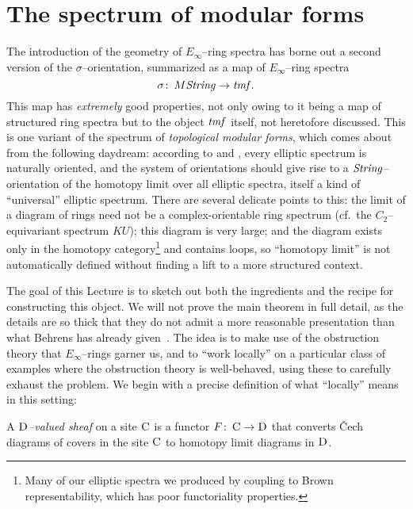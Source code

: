 \section{The spectrum of modular forms}\label{ConstructionOfTMFSection}

The introduction of the geometry of \(E_\infty\)--ring spectra has borne out a second version of the \(\sigma\)--orientation, summarized as a map of \(E_\infty\)--ring spectra \[\sigma\colon\thinspace M\mathit{String} \to \mathit{tmf}.\]  This map has \emph{extremely} good properties, not only owing to it being a map of structured ring spectra but to the object \(\mathit{tmf}\) itself, not heretofore discussed.  This is one variant of the spectrum of \textit{topological modular forms}, which comes about from the following daydream: according to  and , every elliptic spectrum is naturally oriented, and the system of orientations should give rise to a \(\mathit{String}\)--orientation of the homotopy limit over all elliptic spectra, itself a kind of ``universal'' elliptic spectrum.  There are several delicate points to this: the limit of a diagram of rings need not be a complex-orientable ring spectrum (cf.\ the \(C_2\)--equivariant spectrum \(KU\)); this diagram is very large; and the diagram exists only in the homotopy category\footnote{Many of our elliptic spectra we produced by coupling  to Brown representability, which has poor functoriality properties.} and contains loops, so ``homotopy limit'' is not automatically defined without finding a lift to a more structured context.

The goal of this Lecture is to sketch out both the ingredients and the recipe for constructing this object.  We will not prove the main theorem in full detail, as the details are so thick that they do not admit a more reasonable presentation than what Behrens has already given~\cite{BehrensConstruction}.  The idea is to make use of the obstruction theory that \(E_\infty\)--rings garner us, and to ``work locally'' on a particular class of examples where the obstruction theory is well-behaved, using these to carefully exhaust the problem.  We begin with a precise definition of what ``locally'' means in this setting:

\begin{definition}
A \textit{\(\normalfont\textsc{D}\)--valued sheaf} on a site \(\normalfont\textsc{C}\) is a functor \(F\colon\thinspace \normalfont\textsc{C} \to \normalfont\textsc{D}\) that converts \v{C}ech diagrams of covers in the site $\normalfont\textsc{C}$ to homotopy limit diagrams in $\normalfont\textsc{D}$.
\end{definition}

